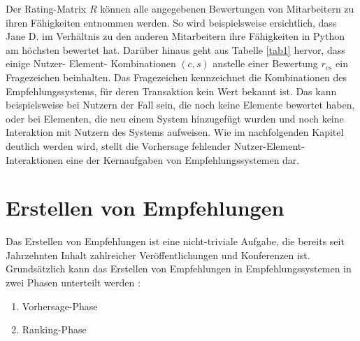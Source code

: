 Der Rating-Matrix $R$ können alle angegebenen Bewertungen von Mitarbeitern zu ihren Fähigkeiten entnommen werden.
So wird beispielsweise ersichtlich, dass Jane D. im Verhältnis zu den anderen Mitarbeitern ihre Fähigkeiten in Python am höchsten bewertet hat.
Darüber hinaus geht aus Tabelle \ref{tab1} hervor, dass einige Nutzer- Element- Kombinationen $(c,s)$ anstelle einer Bewertung $r_{cs}$ ein Fragezeichen beinhalten.
Das Fragezeichen kennzeichnet die Kombinationen des Empfehlungssystems, für deren Transaktion kein Wert bekannt ist.
Das kann beispielsweise bei Nutzern der Fall sein, die noch keine Elemente bewertet haben, oder bei Elementen, die neu einem System hinzugefügt wurden und noch keine Interaktion mit Nutzern des Systems aufweisen.
Wie im nachfolgenden Kapitel deutlich werden wird, stellt die Vorhersage fehlender Nutzer-Element-Interaktionen eine der Kernaufgaben von Empfehlungssystemen dar.

\section{Erstellen von Empfehlungen}
\label{ch:empfehlungssysteme:empfehlungserstellung}
Das Erstellen von Empfehlungen ist eine nicht-triviale Aufgabe, die bereits seit Jahrzehnten Inhalt zahlreicher Veröffentlichungen und Konferenzen ist.
Grundsätzlich kann das Erstellen von Empfehlungen in Empfehlungssystemen in zwei Phasen unterteilt werden \cite[S. 405]{unternährer:article}\cite[S. 854]{adomavicius:4:inbook}:
\begin{enumerate}
	\item Vorhersage-Phase
	\item Ranking-Phase
\end{enumerate}

